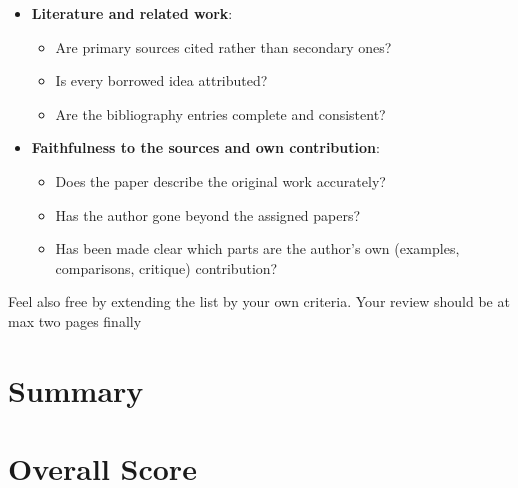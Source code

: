 \documentclass{AIGreview}
\begin{document}
{\begin{itemize}
\begin{itemize}
				\item Does the paper address the assigned topic?
				\item Are the key results included, at a depth that suits the page limit?
			\end{itemize}
			\item \textbf{Literature and related work}:
			\begin{itemize}
				\item Are primary sources cited rather than secondary ones?
				\item Is every borrowed idea attributed?
				\item Are the bibliography entries complete and consistent?
			\end{itemize}    		
			\item \textbf{Faithfulness to the sources and own contribution}:
			\begin{itemize}
				\item Does the paper describe the original work accurately? 
				\item Has the author gone beyond the assigned papers?
				\item Has been made clear which parts are the author’s own (examples, comparisons, critique) contribution?
			\end{itemize}
		\end{itemize}   
		Feel also free by extending the list by your own criteria. Your review should be at max two pages finally
		}
	
	\section*{Summary}
	
	\section*{Overall Score}
	
\end{document}

